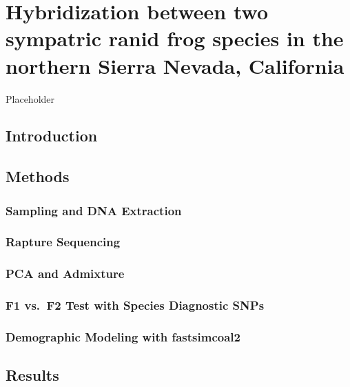 \documentclass[twoside,12pt,final]{ucthesis-CA2012} %
\begin{document}
\begin{ucmainmatter}
\hypertarget{hybrids}{%
\chapter{Hybridization between two sympatric ranid frog species in the
northern Sierra Nevada, California}\label{hybrids}}

Placeholder

\hypertarget{introduction-1}{%
\section{Introduction}\label{introduction-1}}

\hypertarget{methods-1}{%
\section{Methods}\label{methods-1}}

\hypertarget{ch2samplecollection}{%
\subsection{Sampling and DNA Extraction}\label{ch2samplecollection}}

\hypertarget{rapture2}{%
\subsection{Rapture Sequencing}\label{rapture2}}

\hypertarget{pca-and-admixture}{%
\subsection{PCA and Admixture}\label{pca-and-admixture}}

\hypertarget{f1vsf2}{%
\subsection{F1 vs.~F2 Test with Species Diagnostic SNPs}\label{f1vsf2}}

\hypertarget{demographic-modeling-with-fastsimcoal2}{%
\subsection{Demographic Modeling with
fastsimcoal2}\label{demographic-modeling-with-fastsimcoal2}}

\hypertarget{results-1}{%
\section{Results}\label{results-1}}


\end{ucmainmatter}
\end{document}
